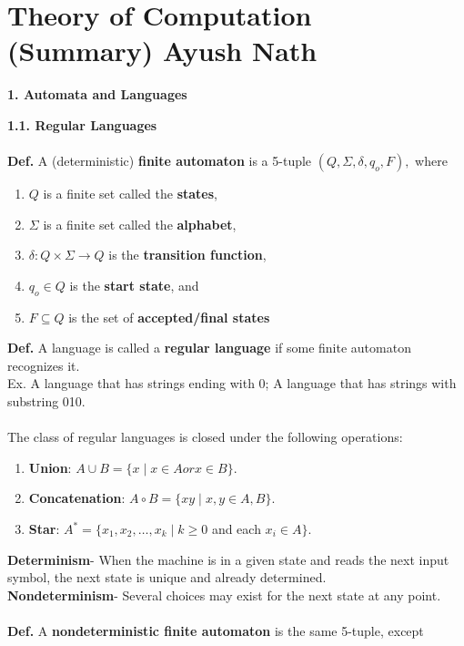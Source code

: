 \documentclass[12pt]{article}
\begin{document}
\section{Theory of Computation (Summary) \hfill Ayush Nath}
\bigskip
\large
\noindent \textbf{1. Automata and Languages}
\small
\begin{multicols}{2}
\noindent \textbf{1.1. Regular Languages}\\
\\
\textbf{Def.} A (deterministic) \textbf{finite automaton} is a 5-tuple $(Q, \Sigma, \delta, q_{o}, F),$ where
\begin{enumerate}
\itemsep-0.5em
\item $Q$ is a finite set called the \textbf{states},
\item $\Sigma$ is a finite set called the \textbf{alphabet},
\item $\delta: Q \times \Sigma \rightarrow Q$ is the \textbf{transition function},
\item $q_{o} \in Q$ is the \textbf{start state}, and
\item $F \subseteq Q$ is the set of \textbf{accepted/final states}
\end{enumerate}
\textbf{Def.} A language is called a \textbf{regular language} if some finite automaton recognizes it.\\
Ex. A language that has strings ending with 0; A language that has strings with substring 010.\\
\\
The class of regular languages is closed under the following operations:
\begin{enumerate}
\itemsep-0.5em
\item \textbf{Union}: $A \cup B = \lbrace x \mid x \in A or x \in B \rbrace.$
\item \textbf{Concatenation}: $A \circ B = \lbrace xy \mid x,y \in A,B \rbrace.$
\item \textbf{Star}: $A^{*} = \lbrace x_{1}, x_{2}, \dots, x_{k} \mid k \geq 0 $ and each $ x_{i} \in A \rbrace.$
\end{enumerate}
\textbf{Determinism}- When the machine is in a given state and reads the next input symbol, the next state is unique and already determined.\\
\textbf{Nondeterminism}- Several choices may exist for the next state at any point.\\
\\
\textbf{Def.} A \textbf{nondeterministic finite automaton} is the same 5-tuple, except
\begin{center}

\end{center}
\end{multicols}
\end{document}
